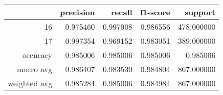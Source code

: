 \begin{table}[h]
\centering
\label{table:5}
\begin{tabular}{rrrrr}
\toprule
 & precision & recall & f1-score & support \\
\midrule
16 & 0.975460 & 0.997908 & 0.986556 & 478.000000 \\
17 & 0.997354 & 0.969152 & 0.983051 & 389.000000 \\
accuracy & 0.985006 & 0.985006 & 0.985006 & 0.985006 \\
macro avg & 0.986407 & 0.983530 & 0.984804 & 867.000000 \\
weighted avg & 0.985284 & 0.985006 & 0.984984 & 867.000000 \\
\bottomrule
\end{tabular}
\end{table}
